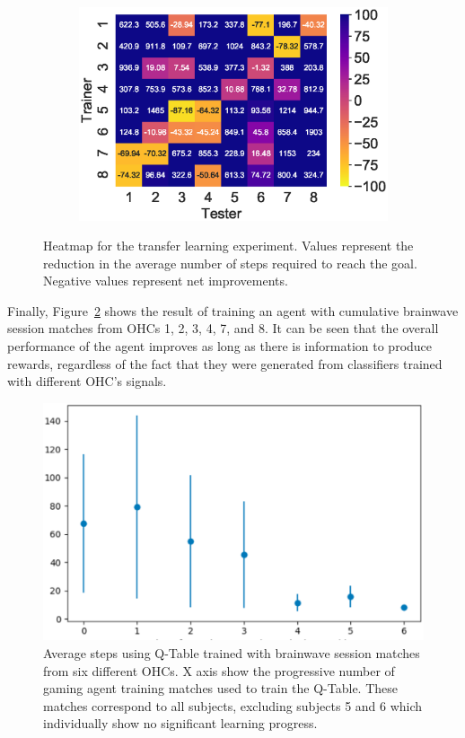 \documentclass[journal]{IEEEtran}
\begin{document}
{{\begin{figure}[h!]
\begin{subfigure}{0.5\textwidth}
\includegraphics[scale=0.60]{revisedimages/transfer_learning_heatmap.eps}
\end{subfigure}
\caption{Heatmap for the transfer learning experiment. Values represent the reduction in the average number of steps required to reach the goal.  Negative values represent net improvements.}
\label{fig:transferlearning}
\end{figure}

Finally, Figure~\ref{fig:avg_steps_all} shows the result of training an agent with cumulative brainwave session matches from OHCs 1, 2, 3, 4, 7, and 8.  It can be seen that the overall performance of the agent improves as long as there is information to produce rewards, regardless of the fact that they were generated from classifiers trained with different OHC's signals.


\begin{figure}[h!]
\centering
\includegraphics[scale=0.4]{Images/Average_steps/all.eps}
\caption{Average steps using Q-Table trained with brainwave session matches from six different OHCs. X axis show the progressive number of gaming agent training matches used to train the Q-Table. These matches correspond to all subjects, excluding subjects 5 and 6 which individually show no significant learning progress.}
\label{fig:avg_steps_all}
\end{figure}

}}
\end{document}
